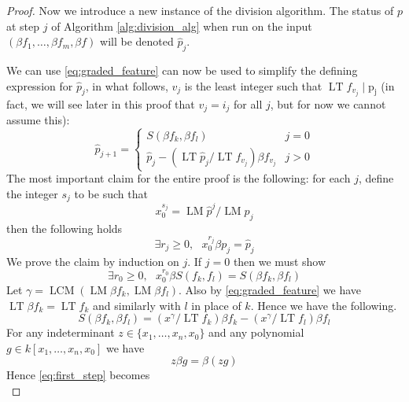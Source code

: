 \documentclass[12pt]{article}
\theoremstyle{plain}
\theoremstyle{definition}
\begin{document}
\begin{proof}
	Now we introduce a new instance of the division algorithm. The status of $p$ at step $j$ of Algorithm \ref{alg:division_alg} when run on the input $(\beta f_1,\hdots, \beta f_m, \beta f)$ will be denoted $\hat{p}_j$.
	
	 We can use \eqref{eq:graded_feature} can now be used to simplify the defining expression for $\hat{p}_j$, in what follows, $v_j$ is the least integer such that $\operatorname{LT}f_{v_j} \mid \operatorname{p_j}$ (in fact, we will see later in this proof that $v_j = i_j$ for all $j$, but for now we cannot assume this):
	\begin{equation}
		\hat{p}_{j+1} =
		\begin{cases}
			S(\beta f_k, \beta f_l) & j = 0\\
			\hat{p}_j - (\operatorname{LT}\hat{p}_j/\operatorname{LT}f_{v_j})\beta f_{v_j} & j > 0
		\end{cases}
		\end{equation}
	The most important claim for the entire proof is the following: for each $j$, define the integer $s_j$ to be such that
	\begin{equation}
		x_0^{s_j} = \operatorname{LM}\hat{p}^j/\operatorname{LM}p_j
		\end{equation}
	then the following holds
	\begin{equation}
		\exists r_j \geq 0,\text{ }x_0^{r_j} \beta p_j = \hat{p}_j
		\end{equation}
	We prove the claim by induction on $j$. If $j = 0$ then we must show
	\begin{equation}
		\exists r_0 \geq 0,\text{ }x_0^{r_0}\beta S(f_k,f_l) = S(\beta f_k, \beta f_l)
		\end{equation}
	Let $\gamma = \operatorname{LCM}(\operatorname{LM}\beta f_k, \operatorname{LM}\beta f_l)$. Also by \eqref{eq:graded_feature} we have $\operatorname{LT}\beta f_k = \operatorname{LT} f_k$ and similarly with $l$ in place of $k$. Hence we have the following.
	\begin{equation}\label{eq:first_step}
		S(\beta f_k, \beta f_l) = (x^\gamma/ \operatorname{LT}f_k)\beta f_k - (x^\gamma/\operatorname{LT}f_l)\beta f_l
		\end{equation}
	For any indeterminant $z \in \{x_1,\hdots,x_n,x_0\}$ and any polynomial $g \in k[x_1,\hdots, x_n, x_0]$ we have
	\begin{equation}
		z\beta g = \beta (zg)
		\end{equation}
	Hence \eqref{eq:first_step} becomes
	\begin{equation}\label{eq:second_step}

\end{equation}
\end{proof}
\end{document}
